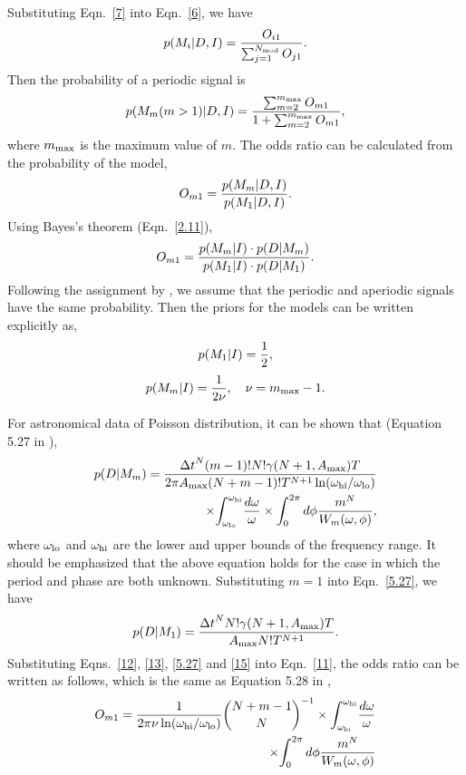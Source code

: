 \documentclass[fleqn,usenatbib]{mnras}
\begin{document}
Substituting Eqn.~\ref{7} into Eqn.~\ref{6}, we have
\begin{equation}\label{2.13}
p(M_i|D,I)={O_{i1}\over {\sum_{j=1}^{N_{\rm mod}} O_{j1}}}.
\end{equation}
Then the probability of a periodic signal is
\begin{equation}\label{5.2}
p(M_m(m>1)|D,I)={{\sum_{m=2}^{m_{\rm max}} O_{m1}}\over {1+\sum_{m=2}^{m_{\rm max}} O_{m1}}},
\end{equation}
where $m_{\rm max}$ is the maximum value of $m$.
The odds ratio can be calculated from the probability of the model,
\begin{equation}
O_{m1}={{p(M_m|D,I)}\over {p(M_1|D,I)}}.
\end{equation}
Using Bayes's theorem (Eqn.~\ref{2.11}), 
\begin{equation}\label{11}
O_{m1}={{p(M_m|I)\cdot p(D|M_m)}\over {p(M_1|I)\cdot p(D|M_1)}}.
\end{equation}
Following the assignment by \citet{1992ApJ...398..146G}, we assume that the periodic and aperiodic signals have the same probability. Then the priors for the models can be written explicitly as,
\begin{equation}\label{12}
p(M_1|I)={1\over 2},	
\end{equation}
\begin{equation}\label{13}
p(M_m|I)={1\over {2\nu}}, \quad \nu =m_{\rm max}-1.
\end{equation}

For astronomical data of Poisson distribution, it can be shown that (Equation 5.27 in \citealp{1992ApJ...398..146G}),
\begin{equation}\label{5.27}
\begin{split}
p(D|M_m)={{{\Delta t}^N (m-1)! N! \gamma(N+1,A_{\rm max})T}\over{2\pi A_{\rm max} (N+m-1)!T^{N+1} \ln(\omega_{\rm hi}/\omega_{\rm lo})}}\\
\times {\int_{\omega_{\rm lo}}^{\omega_{\rm hi}}}{{d\omega}\over{\omega}}\times {\int_0^{2\pi}d\phi{m^N\over W_m(\omega,\phi)}},	
\end{split}
\end{equation}
where $\omega_{\rm lo}$ and $\omega_{\rm hi}$ are the lower and upper bounds of the frequency range.
It should be emphasized that the above equation holds for the case in which the period and phase are both unknown.
Substituting $m=1$ into Eqn.~\ref{5.27}, we have
\begin{equation}\label{15}
p(D|M_1)={{{\Delta t}^N N!\gamma(N+1,A_{\rm max})T}\over {A_{\rm max}N!T^{N+1}}}.
\end{equation}
Substituting Eqns.~\ref{12}, \ref{13}, \ref{5.27} and \ref{15} into Eqn.~\ref{11}, the odds ratio can be written as follows, which is the same as Equation 5.28 in \cite{1992ApJ...398..146G},
\begin{equation}\label{A16}
\begin{split}
O_{m1}={1\over{2\pi \nu \ln(\omega_{\rm hi}/\omega_{\rm lo})}} {{N+m-1}	\choose N}^{-1}\times {\int_{\omega_{\rm lo}}^{\omega_{\rm hi}}}{{d\omega}\over{\omega}}\\
\times {\int_0^{2\pi}d\phi{m^N\over W_m(\omega,\phi)}} 
\end{split}
\end{equation}
\end{document}
